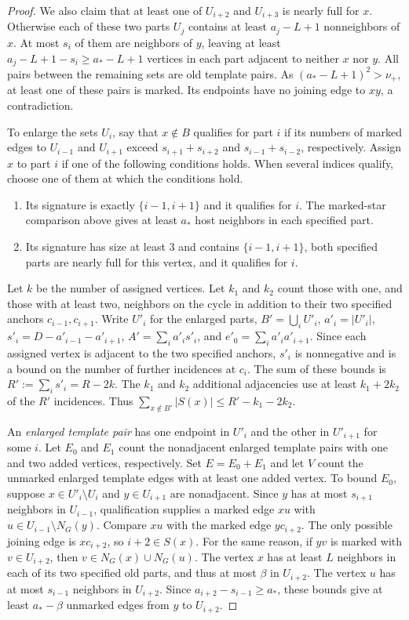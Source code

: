 \documentclass[preprint,11pt,numbers]{elsarticle-arxiv}
\numberwithin{equation}{section}
\theoremstyle{definition}
\begin{document}
\begin{proof}
We also claim that at least one of $U_{i+2}$ and $U_{i+3}$
is nearly full for $x$. Otherwise each of these two parts
$U_j$ contains at least $a_j-L+1$ nonneighbors of $x$. At
most $s_i$ of them are neighbors of $y$, leaving at least
$a_j-L+1-s_i\geq a_*-L+1$ vertices in each part adjacent
to neither $x$ nor $y$. All pairs between the remaining sets
are old template pairs. As $(a_*-L+1)^2>\nu_+$, at least
one of these pairs is marked. Its endpoints have no joining
edge to $xy$, a contradiction.

To enlarge the sets $U_i$, say that $x\notin B$ qualifies for
part $i$ if its numbers of marked edges to $U_{i-1}$ and
$U_{i+1}$ exceed $s_{i+1}+s_{i+2}$ and $s_{i-1}+s_{i-2}$,
respectively. Assign $x$ to part $i$ if one of the following
conditions holds. When several indices qualify, choose one
of them at which the conditions hold.
\begin{enumerate}[label=(\roman*)]
\item Its signature is exactly $\{i-1,i+1\}$ and it qualifies for $i$.
      The marked-star comparison above gives at least $a_*$ host
      neighbors in each specified part.
\item Its signature has size at least $3$ and contains $\{i-1,i+1\}$,
      both specified parts are nearly full for this vertex,
      and it qualifies for $i$.
\end{enumerate}
Let $k$ be the number of assigned vertices. Let $k_1$ and $k_2$
count those with one, and those with at least two, neighbors on the
cycle in addition to their two specified anchors $c_{i-1},c_{i+1}$.
Write $U'_i$ for the enlarged parts, $B'=\bigcup_i U'_i$,
$a'_i=|U'_i|$, $s'_i=D-a'_{i-1}-a'_{i+1}$, $A'=\sum_i a'_is'_i$,
and $e'_0=\sum_i a'_ia'_{i+1}$. Since each assigned vertex is
adjacent to the two specified anchors, $s'_i$ is nonnegative
and is a bound on the number of further incidences at $c_i$.
The sum of these bounds is $R':=\sum_i s'_i=R-2k$.
The $k_1$ and $k_2$ additional adjacencies use at least
$k_1+2k_2$ of the $R'$ incidences. Thus
$\sum_{x\notin B'}|S(x)|\leq R'-k_1-2k_2$.

An \emph{enlarged template pair} has one endpoint in $U'_i$
and the other in $U'_{i+1}$ for some $i$. Let $E_0$ and $E_1$
count the nonadjacent enlarged template pairs with one and
two added vertices, respectively. Set $E=E_0+E_1$ and let $V$
count the unmarked enlarged template edges with at least one
added vertex. To bound $E_0$, suppose $x\in U'_i\setminus U_i$
and $y\in U_{i+1}$ are nonadjacent. Since $y$ has at most
$s_{i+1}$ neighbors in $U_{i-1}$, qualification supplies a
marked edge $xu$ with $u\in U_{i-1}\setminus N_G(y)$.
Compare $xu$ with the marked edge $yc_{i+2}$. The only
possible joining edge is $xc_{i+2}$, so $i+2\in S(x)$.
For the same reason, if $yv$ is marked with $v\in U_{i+2}$,
then $v\in N_G(x)\cup N_G(u)$. The vertex $x$ has at least
$L$ neighbors in each of its two specified old parts, and
thus at most $\beta$ in $U_{i+2}$. The vertex $u$ has
at most $s_{i-1}$ neighbors in $U_{i+2}$. Since
$a_{i+2}-s_{i-1}\geq a_*$, these bounds give at least
$a_*-\beta$ unmarked edges from $y$ to $U_{i+2}$.


\end{proof}
\end{document}
